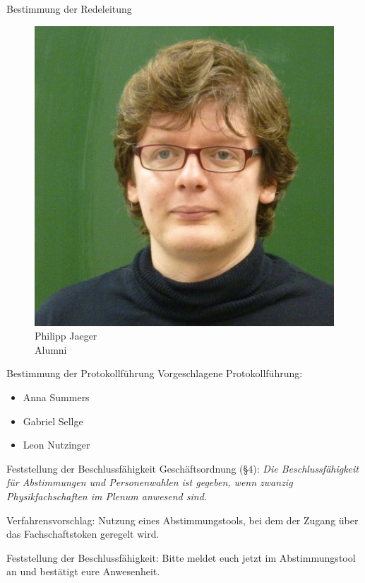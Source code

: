 \documentclass[compress, aspectratio=169]{beamer}
\begin{document}
\begin{frame}{Bestimmung der Redeleitung}
\begin{minipage}{0.4\textwidth}
\begin{figure}
\begin{minipage}[c]{.65\textwidth}
					\includegraphics[height=0.5\textheight]{philipp.jpg}
				\end{minipage} \hfill
				\begin{minipage}[c]{.632\textwidth}
					\caption*{Philipp Jaeger\\ Alumni}
				\end{minipage}
			\end{figure}
		\end{minipage}
		\hspace{0.1\textwidth}
	\end{frame}
	
	\begin{frame}{Bestimmung der Protokollführung}
		Vorgeschlagene Protokollführung:
		\begin{itemize}
			\item Anna Summers 
			\item Gabriel Sellge
			\item Leon Nutzinger
		\end{itemize}
	\end{frame}
	
	\begin{frame}{Feststellung der Beschlussfähigkeit} %
		Geschäftsordnung (§4): \textit{Die Beschlussfähigkeit für Abstimmungen und Personenwahlen ist gegeben, wenn zwanzig Physikfachschaften im Plenum anwesend sind.}\vspace{.5cm}
		
		Verfahrensvorschlag: Nutzung eines Abstimmungstools, bei dem der Zugang über das Fachschaftstoken geregelt wird.\vspace{.5cm}
		
		Feststellung der Beschlussfähigkeit: Bitte meldet euch jetzt im Abstimmungstool an und bestätigt eure Anwesenheit.
	\end{frame}
	
\end{document}
